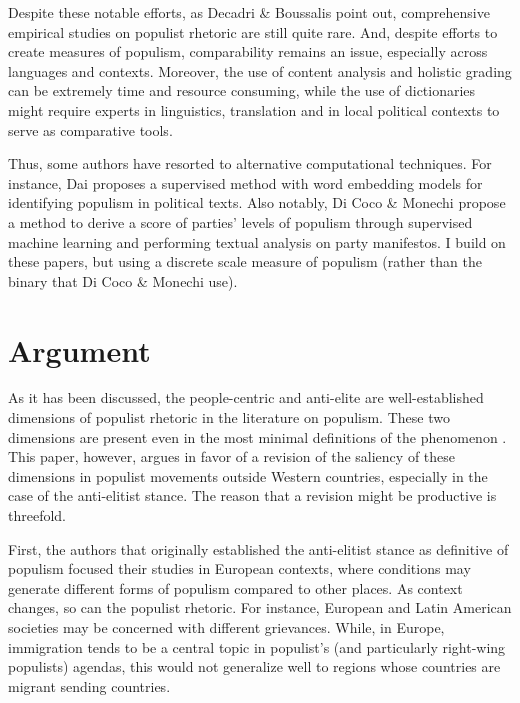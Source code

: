 \documentclass[12pt,letterpaper]{article}
\begin{document}
Despite these notable efforts, as Decadri \& Boussalis\autocite{decadriPopulismPartyMembership2020} point out, comprehensive empirical studies on populist rhetoric are still quite rare. And, despite efforts to create measures of populism, comparability remains an issue, especially across languages and contexts. Moreover, the use of content analysis and holistic grading can be extremely time and resource consuming, while the use of dictionaries might require experts in linguistics, translation and in local political contexts to serve as comparative tools. 

Thus, some authors have resorted to alternative computational techniques. For instance, Dai \autocite{daiMeasuringPopulismContext} proposes a supervised method with word embedding models for identifying populism in political texts. Also notably, Di Coco \& Monechi \autocite{coccoHowPopulistAre2022} propose a method to derive a score of parties' levels of populism through supervised machine learning and performing textual analysis on party manifestos. I build on these papers, but using a discrete scale measure of populism (rather than the binary that Di Coco \& Monechi\autocite{coccoHowPopulistAre2022} use).

\section*{Argument} 

\vspace{.25cm}
\noindent As it has been discussed, the people-centric and anti-elite are well-established dimensions of populist rhetoric in the literature on populism. These two dimensions are present even in the most minimal definitions of the phenomenon \autocite{gurievPoliticalEconomyPopulism2022}. This paper, however, argues in favor of a revision of the saliency of these dimensions in populist movements outside Western countries, especially in the case of the anti-elitist stance. The reason that a revision might be productive is threefold. 

First, the authors that originally established the anti-elitist stance as definitive of populism focused their studies in European contexts, where conditions may generate different forms of populism compared to other places. As context changes, so can the populist rhetoric. For instance, European and Latin American societies may be concerned with different grievances. While, in Europe, immigration tends to be a central topic in populist's (and particularly right-wing populists) agendas, this would not generalize well to regions whose countries are migrant sending countries. 
\end{document}
